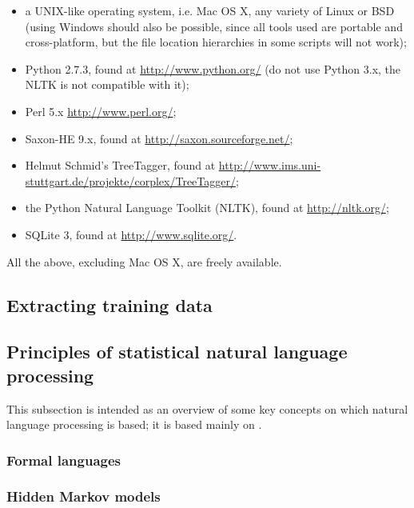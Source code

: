 \begin{itemize}
  \item a UNIX-like operating system, i.e. Mac OS X, any variety of Linux or BSD (using Windows should also be possible, since all tools used are portable and cross-platform, but the file location hierarchies in some scripts will not work);
  \item Python 2.7.3, found at \url{http://www.python.org/} (do not use Python 3.x, the NLTK is not compatible with it);
  \item Perl 5.x \url{http://www.perl.org/};
  \item Saxon-HE 9.x, found at \url{http://saxon.sourceforge.net/};
  \item Helmut Schmid's TreeTagger, found at \url{http://www.ims.uni-stuttgart.de/projekte/corplex/TreeTagger/};
  \item the Python Natural Language Toolkit (NLTK), found at \url{http://nltk.org/};
  \item SQLite 3, found at \url{http://www.sqlite.org/}.
\end{itemize}

All the above, excluding Mac OS X, are freely available.


\subsection{Extracting training data} %
\label{sub:extract_training_data}


\subsection{Principles of statistical natural language processing} %
\label{sub:principles-nlp}

This subsection is intended as an overview of some key concepts on which
natural language processing is based; it is based mainly on 
\citet{manning1999}.

\subsubsection{Formal languages} %
\label{sub:formallang}


\subsubsection{Hidden Markov models} %
\label{ssub:markovchains}


